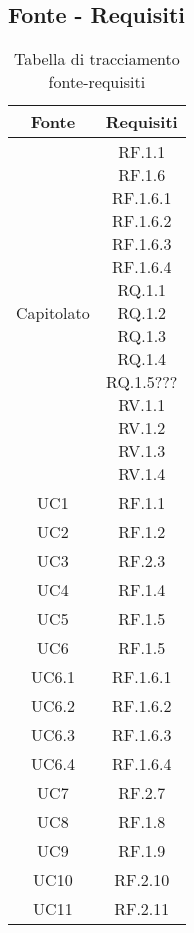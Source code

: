 \subsection{Fonte - Requisiti}
\begin{table}[H]
  \centering
  \begin{tabular}{|c|c|}
    \hline
    \rowcolor[HTML]{036400}
    {\color[HTML]{FFFFFF} Fonte} & {\color[HTML]{FFFFFF} Requisiti} \\ \hline
    \rowcolor[HTML]{EFEFEF}
    Capitolato & \req{RF.1.1 \\ RF.1.6 \\ RF.1.6.1 \\ RF.1.6.2 \\ RF.1.6.3 \\ RF.1.6.4 \\ RQ.1.1 \\ RQ.1.2 \\ RQ.1.3 \\ RQ.1.4 \\ RQ.1.5??? \\ RV.1.1 \\ RV.1.2 \\ RV.1.3 \\ RV.1.4} \\ \hline
    \rowcolor[HTML]{C0C0C0}
    UC1 & RF.1.1 \\ \hline
    \rowcolor[HTML]{EFEFEF}
    UC2 & RF.1.2 \\ \hline
    \rowcolor[HTML]{C0C0C0}
    UC3 & RF.2.3 \\ \hline
    \rowcolor[HTML]{EFEFEF}
    UC4 & RF.1.4 \\ \hline
    \rowcolor[HTML]{C0C0C0}
    UC5 & RF.1.5 \\ \hline
    \rowcolor[HTML]{EFEFEF}
    UC6 & RF.1.5 \\ \hline
    \rowcolor[HTML]{C0C0C0}
    UC6.1 & RF.1.6.1 \\ \hline
    \rowcolor[HTML]{EFEFEF}
    UC6.2 & RF.1.6.2 \\ \hline
    \rowcolor[HTML]{C0C0C0}
    UC6.3 & RF.1.6.3 \\ \hline
    \rowcolor[HTML]{EFEFEF}
    UC6.4 & RF.1.6.4 \\ \hline
    \rowcolor[HTML]{C0C0C0}
    UC7 & RF.2.7 \\ \hline
    \rowcolor[HTML]{EFEFEF}
    UC8 & RF.1.8 \\ \hline
    \rowcolor[HTML]{C0C0C0}
    UC9 & RF.1.9 \\ \hline
    \rowcolor[HTML]{EFEFEF}
    UC10 & RF.2.10 \\ \hline
    \rowcolor[HTML]{C0C0C0}
    UC11 & RF.2.11 \\ \hline
  \end{tabular}
  \caption{Tabella di tracciamento fonte-requisiti}
\end{table}

